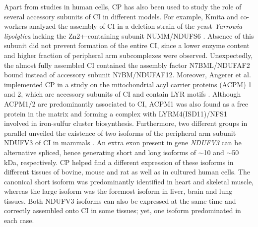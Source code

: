 Apart from studies in human cells, CP has also been used to study the role of several accessory subunits of CI in different models. For example, Kmita and co-workers analyzed the assembly of CI in a deletion strain of the yeast \emph{Yarrowia lipolytica} lacking the Zn2+-containing subunit NUMM/NDUFS6 \cite{Kmita_2015}. Absence of this subunit did not prevent formation of the entire CI, since a lower enzyme content and higher fraction of peripheral arm subcomplexes were observed. Unexpectedly, the almost fully assembled CI contained the assembly factor N7BML/NDUFAF2 bound instead of accessory subunit N7BM/NDUFAF12. Moreover, Angerer et al. implemented CP in a study on the mitochondrial acyl carrier proteins (ACPM) 1 and 2, which are accessory subunits of CI and contain LYR motifs \cite{Angerer_2014}. Although ACPM1/2 are predominantly associated to CI, ACPM1 was also found as a free protein in the matrix and forming a complex with LYRM4(ISD11)/NFS1 involved in iron-sulfur cluster biosynthesis. Furthermore, two different groups in parallel unveiled the existence of two isoforms of the peripheral arm subunit NDUFV3 of CI in mammals \cite{Bridges_2017, Guerrero-Castillo_2017b}. An extra exon present in gene \emph{NDUFV3} can be alternative spliced, hence generating short and long isoforms of $\sim$10 and $\sim$50 kDa, respectively. CP helped find a different expression of these isoforms in different tissues of bovine, mouse and rat as well as in cultured human cells. The canonical short isoform was predominantly identified in heart and skeletal muscle, whereas the large isoform was the foremost isoform in liver, brain and lung tissues. Both NDUFV3 isoforms can also be expressed at the same time and correctly assembled onto CI in some tissues; yet, one isoform predominated in each case.

